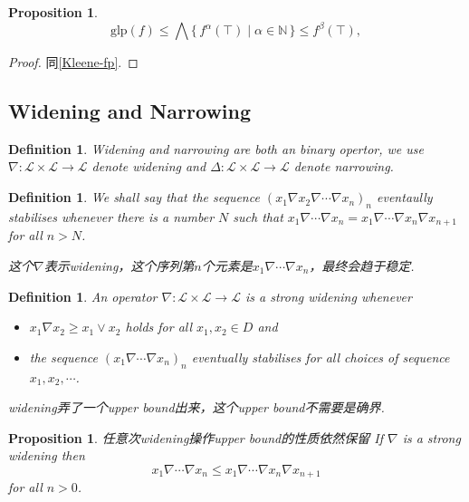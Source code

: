 \documentclass{article}
\newtheorem{proposition}[theorem]{Proposition}
\newtheorem{definition}[theorem]{Definition}
\newcommand*{\xfunc}[4]{{#2}\colon{#3}{#1}{#4}}
\newcommand*{\func}[3]{\xfunc{\to}{#1}{#2}{#3}}
\newcommand\Set[2]{\{\,#1\mid#2\,\}} %
\begin{document}
\begin{proposition}
\rm 
$$
\text{glp}(f) \leq  \bigwedge\Set{f^\alpha(\top)}{\alpha \in \mathbb{N}} \leq f^\beta(\top),
$$
\end{proposition}

\begin{proof}
同\ref{Kleene-fp}. 
\end{proof}



\newpage 
\subsection{Widening and Narrowing}
\begin{definition}
\rm Widening and narrowing are both an binary opertor, we use $\func{\nabla}{\mathcal{L} \times \mathcal{L}}{\mathcal{L}}$ denote widening and $\func{\Delta}{\mathcal{L} \times \mathcal{L}}{\mathcal{L}}$ denote narrowing.

\end{definition}

\begin{definition}
\rm We shall say that the sequence $(x_1 \nabla x_2 \nabla \cdots \nabla x_n)_n$ {\color{red} eventaully stabilises} whenever there is a number $N$ such that $x_1 \nabla \cdots \nabla x_n = x_1 \nabla \cdots \nabla x_n \nabla x_{n+1}$ for all $n > N$.

{\color{blue} 这个$\nabla$表示widening，这个序列第$n$个元素是$x_1 \nabla \cdots \nabla x_n$，最终会趋于稳定}.
\end{definition}

\begin{definition}
\rm An operator $\func{\nabla}{\mathcal{L} \times \mathcal{L}}{\mathcal{L}}$ is a {\color{red} strong widening }whenever
\begin{itemize}
	\item $x_1 \nabla x_2 \geq x_1 \vee x_2$ holds for all $x_1,x_2 \in D$ and
	\item the sequence $(x_1 \nabla \cdots \nabla x_n)_n$ eventually stabilises for all choices of sequence $x_1, x_2 ,\cdots$.
\end{itemize}

{\color{blue} widening弄了一个upper bound出来，这个upper bound不需要是确界}.
\end{definition}

\begin{proposition}
\rm {\color{red} 任意次widening操作upper bound的性质依然保留} If $\nabla$ is a strong widening then
$$
x_1 \nabla \cdots \nabla x_n \leq x_1 \nabla \cdots \nabla x_n \nabla x_{n+1}
$$
for all $n > 0$.
\end{proposition}
\end{document}
